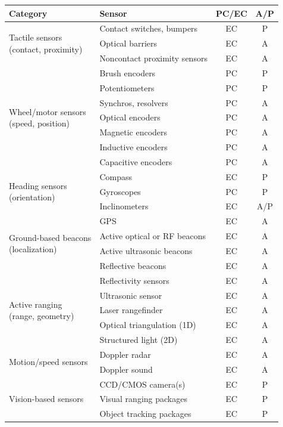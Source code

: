 \documentclass[11pt,a4paper]{article}
\theoremstyle{definition}
\theoremstyle{plain}
\theoremstyle{remark}
\begin{document}
\begin{center}
\begin{tabular}{llcc}
\hline
\textbf{Category} & \textbf{Sensor} & \textbf{PC/EC} & \textbf{A/P} \\
\hline
\multirow{3}{*}{\parbox{3cm}{Tactile sensors\\(contact, proximity)}} & Contact switches, bumpers & EC & P \\
 & Optical barriers & EC & A \\
 & Noncontact proximity sensors & EC & A \\
\hline
\multirow{7}{*}{\parbox{3cm}{\raggedright Wheel/motor sensors\\(speed, position)}} & Brush encoders & PC & P \\
 & Potentiometers & PC & P \\
 & Synchros, resolvers & PC & A \\
 & Optical encoders & PC & A \\
 & Magnetic encoders & PC & A \\
 & Inductive encoders & PC & A \\
 & Capacitive encoders & PC & A \\
\hline
\multirow{3}{*}{\parbox{3cm}{Heading sensors\\(orientation)}} & Compass & EC & P \\
 & Gyroscopes & PC & P \\
 & Inclinometers & EC & A/P \\
\hline
\multirow{4}{*}{\parbox{3cm}{\raggedright Ground-based beacons\\(localization)}} & GPS & EC & A \\
 & Active optical or RF beacons & EC & A \\
 & Active ultrasonic beacons & EC & A \\
 & Reflective beacons & EC & A \\
\hline
\multirow{5}{*}{\parbox{3cm}{Active ranging\\(range, geometry)}} & Reflectivity sensors & EC & A \\
 & Ultrasonic sensor & EC & A \\
 & Laser rangefinder & EC & A \\
 & Optical triangulation (1D) & EC & A \\
 & Structured light (2D) & EC & A \\
\hline
\multirow{2}{*}{\parbox{3cm}{\raggedright Motion/speed sensors}} & Doppler radar & EC & A \\
 & Doppler sound & EC & A \\
\hline
\multirow{3}{*}{\parbox{3cm}{Vision-based sensors}} & CCD/CMOS camera(s) & EC & P \\
 & Visual ranging packages & EC & P \\
 & Object tracking packages & EC & P \\
\hline
\end{tabular}
\end{center}
\end{document}
